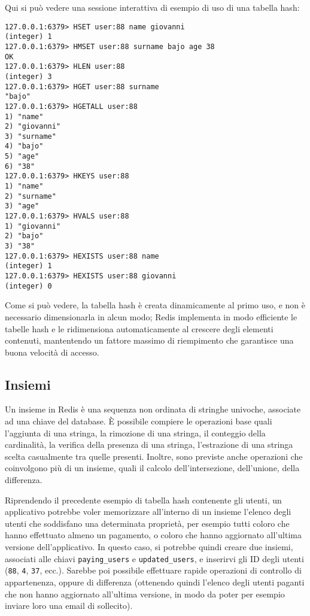 Qui si può vedere una sessione interattiva di esempio di uso di una tabella hash:

\medskip
\begin{lstlisting}
127.0.0.1:6379> HSET user:88 name giovanni
(integer) 1
127.0.0.1:6379> HMSET user:88 surname bajo age 38
OK
127.0.0.1:6379> HLEN user:88
(integer) 3
127.0.0.1:6379> HGET user:88 surname
"bajo"
127.0.0.1:6379> HGETALL user:88
1) "name"
2) "giovanni"
3) "surname"
4) "bajo"
5) "age"
6) "38"
127.0.0.1:6379> HKEYS user:88
1) "name"
2) "surname"
3) "age"
127.0.0.1:6379> HVALS user:88
1) "giovanni"
2) "bajo"
3) "38"
127.0.0.1:6379> HEXISTS user:88 name
(integer) 1
127.0.0.1:6379> HEXISTS user:88 giovanni
(integer) 0
\end{lstlisting}

Come si può vedere, la tabella hash è creata dinamicamente al primo uso, e non è necessario
dimensionarla in alcun modo; Redis implementa in modo efficiente le tabelle hash e le ridimensiona
automaticamente al crescere degli elementi contenuti, mantentendo un fattore massimo di riempimento
che garantisce una buona velocità di accesso.

\subsection{Insiemi}

Un insieme in Redis è una sequenza non ordinata di stringhe univoche, associate ad una chiave del
database. È possibile compiere le operazioni base quali l'aggiunta di una stringa, la rimozione di
una stringa, il conteggio della cardinalità, la verifica della presenza di una stringa, l'estrazione
di una stringa scelta casualmente tra quelle presenti. Inoltre, sono previste anche operazioni che
coinvolgono più di un insieme, quali il calcolo dell'intersezione, dell'unione, della differenza.

Riprendendo il precedente esempio di tabella hash contenente gli utenti, un applicativo potrebbe
voler memorizzare all'interno di un insieme l'elenco degli utenti che soddisfano una determinata
proprietà, per esempio tutti coloro che hanno effettuato almeno un pagamento, o coloro che hanno
aggiornato all'ultima versione dell'applicativo. In questo caso, si potrebbe quindi creare due
insiemi, associati alle chiavi \verb|paying_users| e \verb|updated_users|, e inserirvi gli ID degli
utenti (\verb|88|, \verb|4|, \verb|37|, ecc.). Sarebbe poi possibile effettuare rapide operazioni di
controllo di appartenenza, oppure di differenza (ottenendo quindi l'elenco degli utenti paganti che
non hanno aggiornato all'ultima versione, in modo da poter per esempio inviare loro una email di
sollecito).

